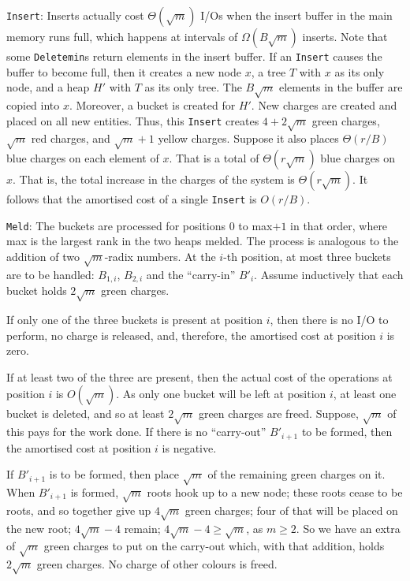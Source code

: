 {\tt Insert}:
Inserts actually cost $\Theta(\sqrt{m})$ I/Os when the insert buffer in the main memory runs full,
which happens at intervals of $\Omega(B\sqrt{m})$ inserts.
Note that some {\tt Deletemin}s return elements in the insert buffer.
If an {\tt Insert} causes the buffer to become full, 
then it creates a new node $x$, a tree $T$ with $x$ as its only node, and
a heap $H'$ with $T$ as its only tree. The $B\sqrt{m}$ elements in the buffer
are copied into $x$. Moreover, a bucket is created for $H'$.
New charges are created and placed on all new entities.
Thus, this {\tt Insert} creates $4+2\sqrt{m}$ green charges, $\sqrt{m}$ red charges,
and $\sqrt{m}+1$ yellow charges. Suppose it also places $\Theta(r/B)$ blue charges
on each element of $x$. That is a total of 
$\Theta(r\sqrt{m})$ blue charges on $x$. 
That is, the total increase in the charges of the system is
$\Theta(r\sqrt{m})$. 
It follows that the amortised cost of a single {\tt Insert} is
$O(r/B)$. 

{\tt Meld}:
The buckets are processed for positions $0$ to max$+1$ in that order, where
max is the largest rank in the two heaps melded. The process is
analogous to the addition of two $\sqrt{m}$-radix numbers.
At the $i$-th position, at most three buckets are to be handled:
$B_{1,i}$, $B_{2,i}$ and the ``carry-in'' $B'_{i}$. 
Assume inductively that each bucket holds
$2\sqrt{m}$ green charges. 

If only one of the three buckets is present at
position $i$, then there is no I/O to perform, no charge is released, and, therefore,
the amortised cost at position $i$ is zero. 

If at least two of the three are present,
then the actual cost of the operations at position $i$ is $O(\sqrt{m})$.
As only one bucket will be left at position $i$, at least one bucket is
deleted, and so at least $2\sqrt{m}$ green charges are freed. Suppose, $\sqrt{m}$ of this 
pays for the work done. If there is no ``carry-out'' $B'_{i+1}$ to be formed,
then the amortised cost at position $i$ is negative.

If $B'_{i+1}$ is to be formed, then
place $\sqrt{m}$ of the remaining green charges
on it. When $B'_{i+1}$ is formed, $\sqrt{m}$ roots hook
up to a new node; these roots cease to be roots, and so together give 
up $4\sqrt{m}$ green charges; four of that will be placed on the new root; 
$4\sqrt{m}-4$ remain; $4\sqrt{m}-4\geq \sqrt{m}$, as $m\geq 2$. 
So we have an extra of $\sqrt{m}$ green charges to put on the carry-out
which, with that addition, holds $2\sqrt{m}$ green charges. No charge of other colours is freed.

